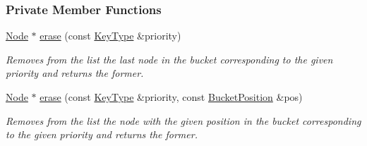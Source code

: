 \subsubsection*{Private Member Functions}
\begin{DoxyCompactItemize}
\item 
\hyperlink{structopenList_1_1BucketedStdMap__T_a54e9b34cd8d421140da4db26b700f5d6}{Node} $\ast$ \hyperlink{structopenList_1_1BucketedStdMap__T_a7079be65a6eb2727503b715f3a38e4d8}{erase} (const \hyperlink{structopenList_1_1BucketedStdMap__T_a307af8874eba4b74cfd21f73a335bf0c}{Key\+Type} \&priority)
\begin{DoxyCompactList}\small\item\em Removes from the list the last node in the bucket corresponding to the given priority and returns the former. \end{DoxyCompactList}\item 
\hyperlink{structopenList_1_1BucketedStdMap__T_a54e9b34cd8d421140da4db26b700f5d6}{Node} $\ast$ \hyperlink{structopenList_1_1BucketedStdMap__T_aed7dbd9ffef954ed4cd060fbe7061c45}{erase} (const \hyperlink{structopenList_1_1BucketedStdMap__T_a307af8874eba4b74cfd21f73a335bf0c}{Key\+Type} \&priority, const \hyperlink{structopenList_1_1BucketedStdMap__T_ac156e6ef0cd1b8435c2312fcd58b69e7}{Bucket\+Position} \&pos)
\begin{DoxyCompactList}\small\item\em Removes from the list the node with the given position in the bucket corresponding to the given priority and returns the former. \end{DoxyCompactList}\end{DoxyCompactItemize}
